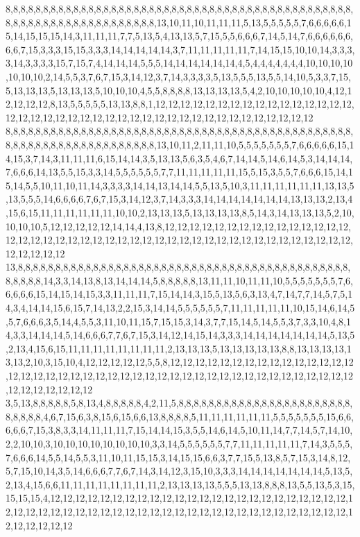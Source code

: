 8,8,8,8,8,8,8,8,8,8,8,8,8,8,8,8,8,8,8,8,8,8,8,8,8,8,8,8,8,8,8,8,8,8,8,8,8,8,8,8,8,8,8,8,8,8,8,8,8,8,8,8,8,8,8,8,8,8,8,8,8,8,8,8,8,8,13,10,11,10,11,11,11,5,13,5,5,5,5,5,7,6,6,6,6,6,15,14,15,15,15,14,3,11,11,11,7,7,5,13,5,4,13,13,5,7,15,5,5,6,6,6,7,14,5,14,7,6,6,6,6,6,6,6,6,7,15,3,3,3,15,15,3,3,3,14,14,14,14,14,3,7,11,11,11,11,11,7,14,15,15,10,10,14,3,3,3,3,14,3,3,3,3,15,7,15,7,4,14,14,14,5,5,5,14,14,14,14,14,14,4,5,4,4,4,4,4,4,4,10,10,10,10,10,10,10,2,14,5,5,3,7,6,7,15,3,14,12,3,7,14,3,3,3,3,5,13,5,5,5,13,5,5,14,10,5,3,3,7,15,5,13,13,13,5,13,13,13,5,10,10,10,4,5,5,8,8,8,8,13,13,13,13,5,4,2,10,10,10,10,10,4,12,12,12,12,12,8,13,5,5,5,5,5,13,13,8,8,1,12,12,12,12,12,12,12,12,12,12,12,12,12,12,12,12,12,12,12,12,12,12,12,12,12,12,12,12,12,12,12,12,12,12,12,12,12,12,12,12,12
8,8,8,8,8,8,8,8,8,8,8,8,8,8,8,8,8,8,8,8,8,8,8,8,8,8,8,8,8,8,8,8,8,8,8,8,8,8,8,8,8,8,8,8,8,8,8,8,8,8,8,8,8,8,8,8,8,8,8,8,8,8,8,8,8,8,13,10,11,2,11,11,10,5,5,5,5,5,5,5,7,6,6,6,6,6,15,14,15,3,7,14,3,11,11,11,6,15,14,14,3,5,13,13,5,6,3,5,4,6,7,14,14,5,14,6,14,5,3,14,14,14,7,6,6,6,14,13,5,5,15,3,3,14,5,5,5,5,5,5,7,7,11,11,11,11,11,15,5,15,3,5,5,7,6,6,6,15,14,15,14,5,5,10,11,10,11,14,3,3,3,3,14,14,13,14,14,5,5,13,5,10,3,11,11,11,11,11,11,13,13,5,13,5,5,5,14,6,6,6,6,7,6,7,15,3,14,12,3,7,14,3,3,3,14,14,14,14,14,14,14,13,13,13,2,13,4,15,6,15,11,11,11,11,11,11,10,10,2,13,13,13,5,13,13,13,13,8,5,14,3,14,13,13,13,5,2,10,10,10,10,5,12,12,12,12,12,14,14,4,13,8,12,12,12,12,12,12,12,12,12,12,12,12,12,12,12,12,12,12,12,12,12,12,12,12,12,12,12,12,12,12,12,12,12,12,12,12,12,12,12,12,12,12,12,12,12,12,12,12
13,8,8,8,8,8,8,8,8,8,8,8,8,8,8,8,8,8,8,8,8,8,8,8,8,8,8,8,8,8,8,8,8,8,8,8,8,8,8,8,8,8,8,8,8,8,8,8,8,8,14,3,3,14,13,8,13,14,14,14,5,8,8,8,8,8,13,11,11,10,11,11,10,5,5,5,5,5,5,5,7,6,6,6,6,6,15,14,15,14,15,3,3,11,11,11,7,15,14,14,3,15,5,13,5,6,3,13,4,7,14,7,7,14,5,7,5,14,3,4,14,14,15,6,15,7,14,13,2,2,15,3,14,14,5,5,5,5,5,5,7,11,11,11,11,11,10,15,14,6,14,5,5,7,6,6,6,3,5,14,4,5,5,3,11,10,11,15,7,15,15,3,14,3,7,7,15,14,5,14,5,5,3,7,3,3,10,4,8,14,3,3,14,14,14,5,14,6,6,6,7,7,6,7,15,3,14,12,14,15,14,3,3,3,14,14,14,14,14,14,14,5,13,5,2,13,4,15,6,15,11,11,11,11,11,11,11,11,2,13,13,13,5,13,13,13,13,13,8,8,13,13,13,13,13,13,2,10,3,15,10,4,12,12,12,12,12,5,5,8,12,12,12,12,12,12,12,12,12,12,12,12,12,12,12,12,12,12,12,12,12,12,12,12,12,12,12,12,12,12,12,12,12,12,12,12,12,12,12,12,12,12,12,12,12,12,12,12,12,12
3,5,13,8,8,8,8,8,5,8,13,4,8,8,8,8,8,4,2,11,5,8,8,8,8,8,8,8,8,8,8,8,8,8,8,8,8,8,8,8,8,8,8,8,8,8,8,8,8,4,6,7,15,6,3,8,15,6,15,6,6,13,8,8,8,8,5,11,11,11,11,11,11,5,5,5,5,5,5,5,15,6,6,6,6,6,7,15,3,8,3,3,14,11,11,11,7,15,14,14,15,3,5,5,14,6,14,5,10,11,14,7,7,14,5,7,14,10,2,2,10,10,3,10,10,10,10,10,10,10,10,3,3,14,5,5,5,5,5,5,7,7,11,11,11,11,11,7,14,3,5,5,5,7,6,6,6,14,5,5,14,5,5,3,11,10,11,15,15,3,14,15,15,6,6,3,7,7,15,5,13,8,5,7,15,3,14,8,12,5,7,15,10,14,3,5,14,6,6,6,7,7,6,7,14,3,14,12,3,15,10,3,3,3,14,14,14,14,14,14,14,5,13,5,2,13,4,15,6,6,11,11,11,11,11,11,11,11,2,13,13,13,13,5,5,5,13,13,8,8,8,13,5,5,13,5,3,15,15,15,15,4,12,12,12,12,12,12,12,12,12,12,12,12,12,12,12,12,12,12,12,12,12,12,12,12,12,12,12,12,12,12,12,12,12,12,12,12,12,12,12,12,12,12,12,12,12,12,12,12,12,12,12,12,12,12,12,12,12,12
